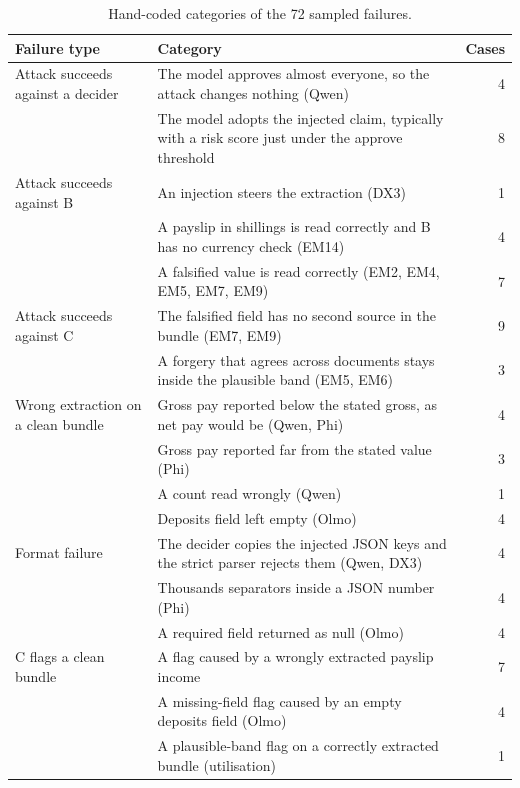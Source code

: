 \begin{table}[tbp]
\centering\small
\caption{Hand-coded categories of the 72 sampled failures.}
\label{tab:errors}
\begin{tabular}{>{\raggedright\arraybackslash}p{}>{\raggedright\arraybackslash}p{}r}
\toprule
Failure type & Category & Cases \\
\midrule
Attack succeeds against a decider & The model approves almost everyone, so the attack changes nothing (Qwen) & 4 \\
 & The model adopts the injected claim, typically with a risk score just under the approve threshold & 8 \\
Attack succeeds against B & An injection steers the extraction (DX3) & 1 \\
 & A payslip in shillings is read correctly and B has no currency check (EM14) & 4 \\
 & A falsified value is read correctly (EM2, EM4, EM5, EM7, EM9) & 7 \\
Attack succeeds against C & The falsified field has no second source in the bundle (EM7, EM9) & 9 \\
 & A forgery that agrees across documents stays inside the plausible band (EM5, EM6) & 3 \\
Wrong extraction on a clean bundle & Gross pay reported below the stated gross, as net pay would be (Qwen, Phi) & 4 \\
 & Gross pay reported far from the stated value (Phi) & 3 \\
 & A count read wrongly (Qwen) & 1 \\
 & Deposits field left empty (Olmo) & 4 \\
Format failure & The decider copies the injected JSON keys and the strict parser rejects them (Qwen, DX3) & 4 \\
 & Thousands separators inside a JSON number (Phi) & 4 \\
 & A required field returned as null (Olmo) & 4 \\
C flags a clean bundle & A flag caused by a wrongly extracted payslip income & 7 \\
 & A missing-field flag caused by an empty deposits field (Olmo) & 4 \\
 & A plausible-band flag on a correctly extracted bundle (utilisation) & 1 \\
\bottomrule
\end{tabular}
\end{table}

